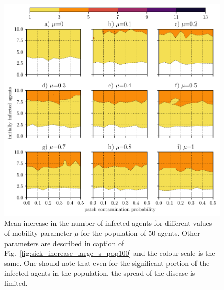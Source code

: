 \documentclass[11pt,a4paper]{article}
\begin{document}
\begin{figure}[ht!]
\includegraphics{plots/sick_increase_large_s_pop50.pdf}
\caption{Mean increase in the number of infected agents for different values of mobility parameter $\mu$ for the population of 50 agents. Other parameters are described in caption of Fig.~\ref{fig:sick_increase_large_s_pop100} and the colour scale is the same. One should note that even for the significant portion of the infected agents in the population, the spread of the disease is limited.}
\label{fig:sick_increase_large_s_pop50}
\end{figure}
\end{document}
